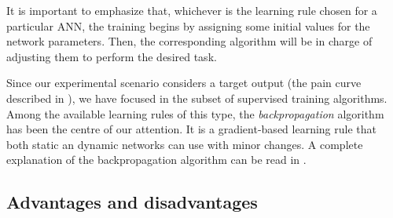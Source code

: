 It is important to emphasize that, whichever is the learning rule
chosen for a particular ANN, the training begins by assigning some
initial values for the network parameters. Then, the corresponding
algorithm will be in charge of adjusting them to perform the desired
task.

Since our experimental scenario considers a target output (the pain
curve described in ), we have focused in the subset
of supervised training algorithms.  Among the available learning rules
of this type, the \emph{backpropagation} algorithm has been the centre
of our attention. It is a gradient-based learning rule that both
static an dynamic networks can use with minor changes. A complete
explanation of the backpropagation algorithm can be read
in .


\subsection{Advantages and disadvantages}




